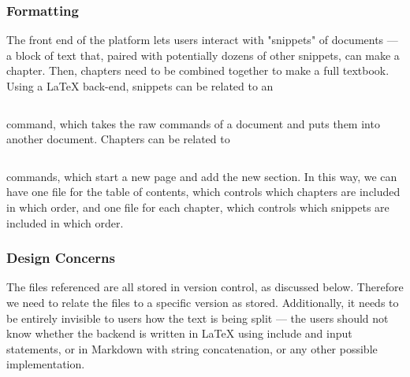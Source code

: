 \documentclass[onecolumn, draftclsnofoot,10pt, compsoc]{IEEEtran}
\begin{document}
\subsubsection{Formatting}
\noindent The front end of the platform lets users interact with "snippets" of 
documents — a block of text that, paired with potentially dozens of other 
snippets, can make a chapter. Then, chapters need to be combined together to 
make a full textbook. Using a LaTeX back-end, snippets can be related to an 
\begin{verbatim}\end{verbatim} command, which takes the raw commands 
of a document and puts them into another document. Chapters can be related to 
\begin{verbatim}\end{verbatim} commands, which start a new page and 
add the new section. In this way, we can have one file for the table of 
contents, which controls which chapters are included in which order, and one 
file for each chapter, which controls which snippets are included in which 
order. \\

\subsubsection{Design Concerns}
\noindent The files referenced are all stored in version control, as discussed 
below. Therefore we need to relate the files to a specific version as stored. 
Additionally, it needs to be entirely invisible to users how the text is being 
split — the users should not know whether the backend is written in LaTeX 
using include and input statements, or in Markdown with string concatenation, 
or any other possible implementation. \\

\end{document}

